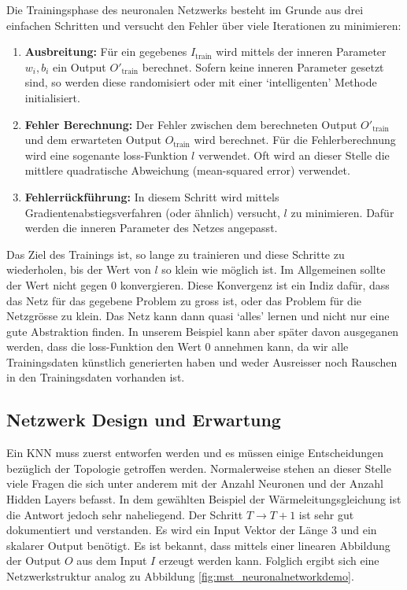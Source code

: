 Die Trainingsphase des neuronalen Netzwerks besteht im Grunde aus drei einfachen Schritten und versucht den Fehler über viele Iterationen zu minimieren:
\begin{enumerate}
	\item {\textbf{Ausbreitung:} Für ein gegebenes $I_{\text{train}}$
	wird mittels der inneren Parameter $w_{i}, b_{i}$ ein Output
	$O'_{\text{train}}$ berechnet. Sofern keine inneren Parameter
	gesetzt sind, so werden diese randomisiert oder mit einer
	`intelligenten' Methode initialisiert.}
	\item {\textbf{Fehler Berechnung:} Der Fehler zwischen dem
	berechneten Output $O'_{\text{train}}$ und dem erwarteten
	Output $O_{\text{train}}$ wird berechnet. Für die
	Fehlerberechnung wird eine sogenante loss-Funktion $l$
	verwendet. Oft wird an dieser Stelle die mittlere quadratische
	Abweichung (mean-squared error) verwendet.}
	\item{\textbf{Fehlerrückführung:} In diesem Schritt wird
	mittels Gradientenabstiegsverfahren (oder ähnlich) versucht,
	$l$ zu minimieren. Dafür werden die inneren Parameter des
	Netzes angepasst.}
\end{enumerate}
Das Ziel des Trainings ist, so lange zu trainieren und diese Schritte zu wiederholen, bis der Wert von $l$ so klein wie möglich ist. 
Im Allgemeinen sollte der Wert nicht gegen 0 konvergieren. Diese
Konvergenz ist ein Indiz dafür, dass das Netz für das gegebene
Problem zu gross ist, oder das Problem für die Netzgrösse zu klein.
Das Netz kann dann quasi `alles' lernen und nicht nur eine gute
Abstraktion finden.
In unserem Beispiel kann aber später davon ausgeganen werden, dass die loss-Funktion den Wert 0 annehmen kann, da wir alle Trainingsdaten künstlich generierten haben und weder Ausreisser noch Rauschen in den Trainingsdaten vorhanden ist.

\subsection{Netzwerk Design und Erwartung}
Ein KNN muss zuerst entworfen werden und es müssen einige Entscheidungen bezüglich der Topologie getroffen werden. Normalerweise stehen an dieser Stelle viele Fragen die sich unter anderem mit der Anzahl Neuronen und der Anzahl Hidden Layers befasst. In dem gewählten Beispiel der Wärmeleitungsgleichung ist die Antwort jedoch sehr naheliegend. Der Schritt $T \rightarrow T+1$ ist sehr gut dokumentiert und verstanden. Es wird ein Input Vektor der Länge 3 und ein skalarer Output benötigt. Es ist bekannt, dass mittels einer linearen Abbildung der Output $O$ aus dem Input $I$ erzeugt werden kann. Folglich ergibt sich eine Netzwerkstruktur analog zu Abbildung \ref{fig:mst_neuronalnetworkdemo}.

